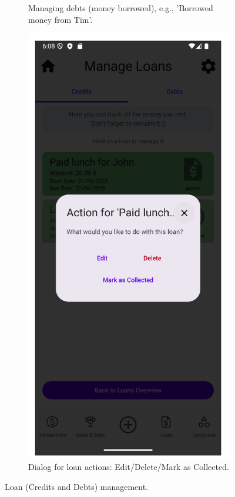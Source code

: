 \documentclass[a4paper,12pt]{article}
\begin{document}
\begin{figure}[H]
\begin{subfigure}[b]{0.23\textwidth}
        \caption{Managing debts (money borrowed), e.g., 'Borrowed money from Tim'.}
        \label{fig:manage_debts}
    \end{subfigure}
    \hfill
    \begin{subfigure}[b]{0.23\textwidth}
        \includegraphics[width=\textwidth]{manage_loans_interaction_dialog.png}
        \caption{Dialog for loan actions: Edit/Delete/Mark as Collected.}
        \label{fig:loan_actions_dialog}
    \end{subfigure}
    \caption{Loan (Credits and Debts) management.}
    \label{fig:loan_management_1}
\end{figure}
\end{document}
